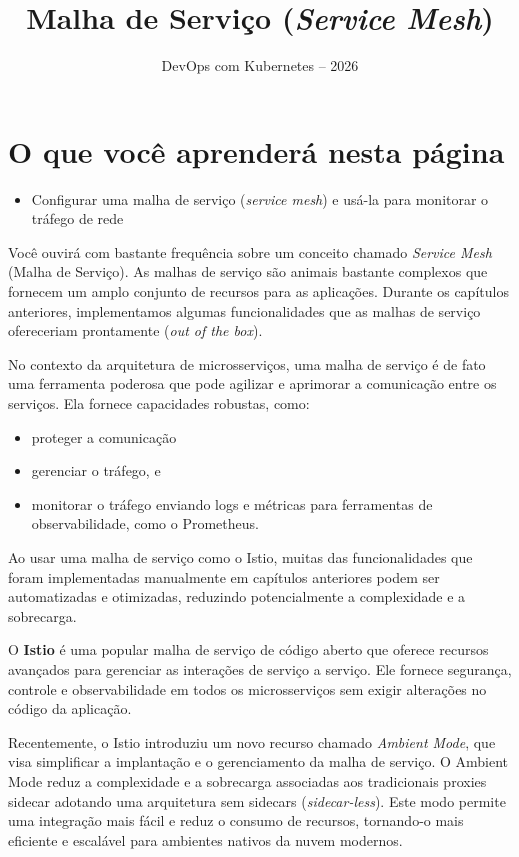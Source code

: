 \documentclass[11pt,a4paper]{article}
\title{\color{secondary}\Huge\textbf{Malha de Serviço (\textit{Service Mesh})}}
\author{\color{primary}DevOps com Kubernetes -- 2026}
\date{}
\begin{document}
\maketitle

\section*{\color{primary}O que você aprenderá nesta página}
\begin{itemize}
    \item Configurar uma malha de serviço (\textit{service mesh}) e usá-la para monitorar o tráfego de rede
\end{itemize}

Você ouvirá com bastante frequência sobre um conceito chamado \textit{Service Mesh} (Malha de Serviço). As malhas de serviço são animais bastante complexos que fornecem um amplo conjunto de recursos para as aplicações. Durante os capítulos anteriores, implementamos algumas funcionalidades que as malhas de serviço ofereceriam prontamente (\textit{out of the box}).

No contexto da arquitetura de microsserviços, uma malha de serviço é de fato uma ferramenta poderosa que pode agilizar e aprimorar a comunicação entre os serviços. Ela fornece capacidades robustas, como:
\begin{itemize}
    \item proteger a comunicação
    \item gerenciar o tráfego, e
    \item monitorar o tráfego enviando logs e métricas para ferramentas de observabilidade, como o Prometheus.
\end{itemize}

Ao usar uma malha de serviço como o Istio, muitas das funcionalidades que foram implementadas manualmente em capítulos anteriores podem ser automatizadas e otimizadas, reduzindo potencialmente a complexidade e a sobrecarga.

O \textbf{Istio} é uma popular malha de serviço de código aberto que oferece recursos avançados para gerenciar as interações de serviço a serviço. Ele fornece segurança, controle e observabilidade em todos os microsserviços sem exigir alterações no código da aplicação.

Recentemente, o Istio introduziu um novo recurso chamado \textit{Ambient Mode}, que visa simplificar a implantação e o gerenciamento da malha de serviço. O Ambient Mode reduz a complexidade e a sobrecarga associadas aos tradicionais proxies sidecar adotando uma arquitetura sem sidecars (\textit{sidecar-less}). Este modo permite uma integração mais fácil e reduz o consumo de recursos, tornando-o mais eficiente e escalável para ambientes nativos da nuvem modernos.
\end{document}
